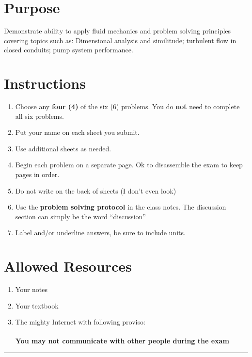 \documentclass[12pt]{article}
\begin{document}
\section*{ }
\section*{Purpose}
Demonstrate ability to apply fluid mechanics and problem solving principles covering topics such as: Dimensional analysis and similitude; turbulent flow in closed conduits; pump system performance.
\section*{Instructions}
\begin{enumerate}
\item Choose any \textbf{four (4)} of the six (6) problems.  You do \textbf{not} need to complete all six problems.
\item Put your name on each sheet you submit.  
\item Use additional sheets as needed. 
\item Begin each problem on a separate page.  Ok to disassemble the exam to keep pages in order.
\item Do not write on the back of sheets (I don't even look)
\item Use the \textbf{problem solving protocol} in the class notes.  The discussion section can simply be the word ``discussion'' 
\item Label and/or underline answers, be sure to include units.
\end{enumerate}
\section*{Allowed Resources}
\begin{enumerate}
\item Your notes
\item Your textbook
\item The mighty Internet with following proviso: \\
 \\ \textbf{You may not communicate with other people during the exam}
\end{enumerate}
\noindent\rule{\linewidth}{0.4pt}
\clearpage
\end{document}
